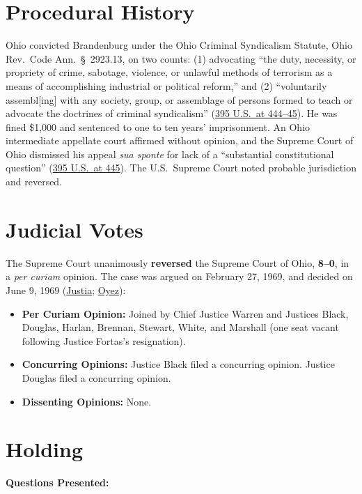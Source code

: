 \documentclass[12pt]{article}
\begin{document}
\section{Procedural History}
Ohio convicted Brandenburg under the Ohio Criminal Syndicalism Statute, Ohio Rev.\ Code Ann.\ \S~2923.13, on two counts: (1) advocating ``the duty, necessity, or propriety of crime, sabotage, violence, or unlawful methods of terrorism as a means of accomplishing industrial or political reform,'' and (2) ``voluntarily assembl[ing] with any society, group, or assemblage of persons formed to teach or advocate the doctrines of criminal syndicalism'' (\href{https://supreme.justia.com/cases/federal/us/395/444/}{395 U.S.\ at 444--45}). He was fined \$1,000 and sentenced to one to ten years' imprisonment. An Ohio intermediate appellate court affirmed without opinion, and the Supreme Court of Ohio dismissed his appeal \emph{sua sponte} for lack of a ``substantial constitutional question'' (\href{https://supreme.justia.com/cases/federal/us/395/444/}{395 U.S.\ at 445}). The U.S.\ Supreme Court noted probable jurisdiction and reversed.

\section{Judicial Votes}
The Supreme Court unanimously \textbf{reversed} the Supreme Court of Ohio, \textbf{8--0}, in a \emph{per curiam} opinion. The case was argued on February 27, 1969, and decided on June 9, 1969 (\href{https://supreme.justia.com/cases/federal/us/395/444/}{Justia}; \href{https://www.oyez.org/cases/1968/492}{Oyez}):

\begin{itemize}
    \item \textbf{Per Curiam Opinion:} Joined by Chief Justice Warren and Justices Black, Douglas, Harlan, Brennan, Stewart, White, and Marshall (one seat vacant following Justice Fortas's resignation).
    \item \textbf{Concurring Opinions:} Justice Black filed a concurring opinion. Justice Douglas filed a concurring opinion.
    \item \textbf{Dissenting Opinions:} None.
\end{itemize}

\section{Holding}
\textbf{Questions Presented:}
\end{document}

